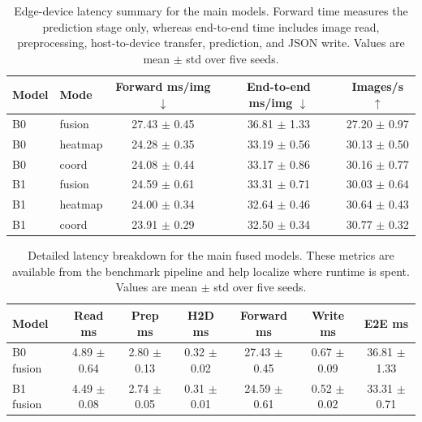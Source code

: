 \documentclass[10pt,letterpaper]{article}
\begin{document}
\begin{table}[H]
\centering
\footnotesize
\caption{Edge-device latency summary for the main models. Forward time measures the prediction stage only, whereas end-to-end time includes image read, preprocessing, host-to-device transfer, prediction, and JSON write. Values are mean $\pm$ std over five seeds.}
\label{tab:latency}
\begin{tabular}{llccc}
\toprule
Model & Mode & Forward ms/img $\downarrow$ & End-to-end ms/img $\downarrow$ & Images/s $\uparrow$ \\
\midrule
B0 & fusion & 27.43 $\pm$ 0.45 & 36.81 $\pm$ 1.33 & 27.20 $\pm$ 0.97 \\
B0 & heatmap & 24.28 $\pm$ 0.35 & 33.19 $\pm$ 0.56 & 30.13 $\pm$ 0.50 \\
B0 & coord & 24.08 $\pm$ 0.44 & 33.17 $\pm$ 0.86 & 30.16 $\pm$ 0.77 \\
B1 & fusion & 24.59 $\pm$ 0.61 & 33.31 $\pm$ 0.71 & 30.03 $\pm$ 0.64 \\
B1 & heatmap & 24.00 $\pm$ 0.34 & 32.64 $\pm$ 0.46 & 30.64 $\pm$ 0.43 \\
B1 & coord & 23.91 $\pm$ 0.29 & 32.50 $\pm$ 0.34 & 30.77 $\pm$ 0.32 \\
\bottomrule
\end{tabular}
\end{table}

\begin{table}[H]
\centering
\footnotesize
\caption{Detailed latency breakdown for the main fused models. These metrics are available from the benchmark pipeline and help localize where runtime is spent. Values are mean $\pm$ std over five seeds.}
\label{tab:latency_breakdown}
\begin{tabular}{lcccccc}
\toprule
Model & Read ms & Prep ms & H2D ms & Forward ms & Write ms & E2E ms \\
\midrule
B0 fusion & 4.89 $\pm$ 0.64 & 2.80 $\pm$ 0.13 & 0.32 $\pm$ 0.02 & 27.43 $\pm$ 0.45 & 0.67 $\pm$ 0.09 & 36.81 $\pm$ 1.33 \\
B1 fusion & 4.49 $\pm$ 0.08 & 2.74 $\pm$ 0.05 & 0.31 $\pm$ 0.01 & 24.59 $\pm$ 0.61 & 0.52 $\pm$ 0.02 & 33.31 $\pm$ 0.71 \\
\bottomrule
\end{tabular}
\end{table}
\end{document}

